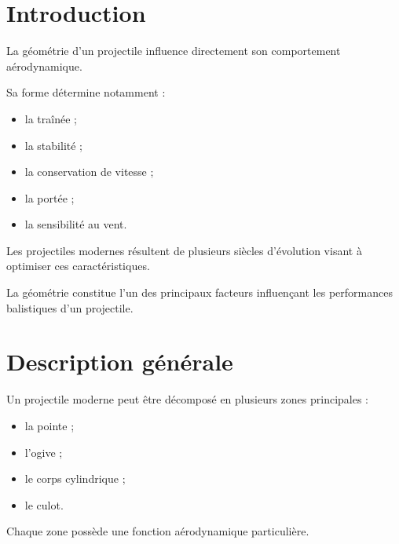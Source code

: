 
\section{Introduction}

La géométrie d'un projectile influence directement son comportement
aérodynamique.

Sa forme détermine notamment :

\begin{itemize}
    \item la traînée ;
    \item la stabilité ;
    \item la conservation de vitesse ;
    \item la portée ;
    \item la sensibilité au vent.
\end{itemize}

Les projectiles modernes résultent de plusieurs siècles d'évolution visant à
optimiser ces caractéristiques.

\begin{aretenir}

La géométrie constitue l'un des principaux facteurs influençant les
performances balistiques d'un projectile.

\end{aretenir}

\section{Description générale}

Un projectile moderne peut être décomposé en plusieurs zones principales :

\begin{itemize}
    \item la pointe ;
    \item l'ogive ;
    \item le corps cylindrique ;
    \item le culot.
\end{itemize}

Chaque zone possède une fonction aérodynamique particulière.

